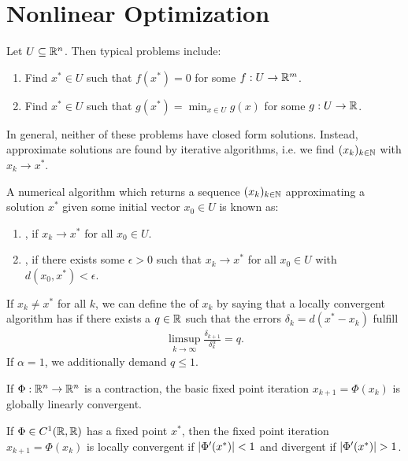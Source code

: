 \section{Nonlinear Optimization}
Let $U \subseteq \mathbb{R}^n$. Then typical problems include:
\begin{enumerate}
	\item Find $x^* \in U$ such that $f(x^*) = 0$ for some $f : U \to \mathbb{R}^m$.
	\item Find $x^* \in U$ such that $\displaystyle g(x^*) = \min_{x \in U} g(x)$ for some $g : U \to \mathbb{R}$.
\end{enumerate}
In general, neither of these problems have closed form solutions. Instead, approximate solutions are found by iterative algorithms, i.e. we find $(x_k)_{k \in \mathbb{N}}$ with $x_k \to x^*$.
\begin{definition}
	A numerical algorithm which returns a sequence $(x_k)_{k \in \mathbb{N}}$ approximating a solution $x^*$ given some initial vector $x_0 \in U$ is known as:
	\begin{enumerate}
		\item {}, if $x_k \to x^*$ for all $x_0 \in U$.
		\item {}, if there exists some $\epsilon > 0$ such that $x_k \to x^*$ for all $x_0 \in U$ with $d(x_0, x^*) < \epsilon$.
	\end{enumerate}
\end{definition}
\begin{definition}
	If $x_k \neq x^*$ for all $k$, we can define the  of $x_k$ by saying that a locally convergent algorithm has  if there exists a $q \in \mathbb{R}$ such that the errors $\delta_k = d(x^* - x_k)$ fulfill
	\begin{align*}
		\limsup_{k \to \infty} \frac{\delta_{k+1}}{\delta_k^\alpha} = q.
	\end{align*}
	If $\alpha = 1$, we additionally demand $q \leq 1$.
\end{definition}
\begin{proposition}
	If $\Phi : \mathbb{R}^n \to \mathbb{R}^n$ is a contraction, the basic fixed point iteration $x_{k+1} = \Phi(x_k)$ is globally linearly convergent.
\end{proposition}
\begin{proposition}
	If $\Phi \in C^1(\mathbb{R}, \mathbb{R})$ has a fixed point $x^*$, then the fixed point iteration $x_{k+1} = \Phi(x_k)$ is locally convergent if $\abs{\Phi'(x^*)} < 1$ and divergent if $\abs{\Phi'(x^*)} > 1$.
\end{proposition}
